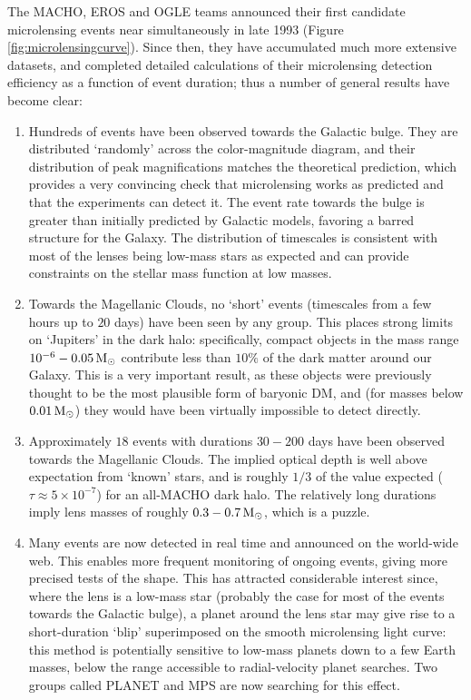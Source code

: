 \documentclass[a4paper,10pt]{article}
\begin{document}
{\noindent}The MACHO, EROS and OGLE teams announced their first candidate microlensing events near simultaneously in late 1993 (Figure \ref{fig:microlensingcurve}). Since then, they have accumulated much more extensive datasets, and completed detailed calculations of their microlensing detection efficiency as a function of event duration; thus a number of general results have become clear:

\begin{enumerate}
    \item Hundreds of events have been observed towards the Galactic bulge. They are distributed `randomly' across the color-magnitude diagram, and their distribution of peak magnifications matches the theoretical prediction, which provides a very convincing check that microlensing works as predicted and that the experiments can detect it. The event rate towards the bulge is greater than initially predicted by Galactic models, favoring a barred structure for the Galaxy. The distribution of timescales is consistent with most of the lenses being low-mass stars as expected and can provide constraints on the stellar mass function at low masses.
    \item Towards the Magellanic Clouds, no `short' events (timescales from a few hours up to $20$ days) have been seen by any group. This places strong limits on `Jupiters' in the dark halo: specifically, compact objects in the mass range $10^{-6}-0.05\,{\rm M_\odot}$ contribute less than $10\%$ of the dark matter around our Galaxy. This is a very important result, as these objects were previously thought to be the most plausible form of baryonic DM, and (for masses below $0.01\,{\rm M_\odot}$) they would have been virtually impossible to detect directly.
    \item Approximately $18$ events with durations $30-200$ days have been observed towards the Magellanic Clouds. The implied optical depth is well above expectation from `known' stars, and is roughly $1/3$ of the value expected ($\tau\approx5\times10^{-7}$) for an all-MACHO dark halo. The relatively long durations imply lens masses of roughly $0.3-0.7\,{\rm M_\odot}$, which is a puzzle.
    \item Many events are now detected in real time and announced on the world-wide web. This enables more frequent monitoring of ongoing events, giving more precised tests of the shape. This has attracted considerable interest since, where the lens is a low-mass star (probably the case for most of the events towards the Galactic bulge), a planet around the lens star may give rise to a short-duration `blip' superimposed on the smooth microlensing light curve: this method is potentially sensitive to low-mass planets down to a few Earth masses, below the range accessible to radial-velocity planet searches. Two groups called PLANET and MPS are now searching for this effect.
\end{enumerate}
\end{document}
